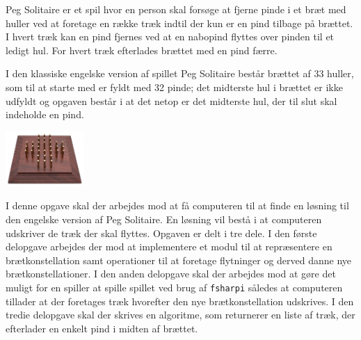 Peg Solitaire er et spil hvor en person skal forsøge at fjerne pinde i
et bræt med huller ved at foretage en række træk indtil der kun er en
pind tilbage på brættet. I hvert træk kan en pind fjernes ved at en
nabopind flyttes over pinden til et ledigt hul. For hvert træk
efterlades brættet med en pind færre.

\begin{minipage}{.75\linewidth}
I den klassiske engelske version af spillet Peg Solitaire består
brættet af 33 huller, som til at starte med er fyldt med 32 pinde; det
midterste hul i brættet er ikke udfyldt og opgaven består i at det
netop er det midterste hul, der til slut skal indeholde en pind.
\end{minipage}
\begin{minipage}{.2\linewidth}
  \includegraphics[width=3cm]{solitaire.png}
\end{minipage}

I denne opgave skal der arbejdes mod at få computeren til at finde en
løsning til den engelske version af Peg Solitaire. En løsning vil
bestå i at computeren udskriver de træk der skal flyttes. Opgaven er
delt i tre dele. I den første delopgave arbejdes der mod at
implementere et modul til at repræsentere en brætkonstellation samt
operationer til at foretage flytninger og derved danne nye
brætkonstellationer. I den anden delopgave skal der arbejdes mod at
gøre det muligt for en spiller at spille spillet ved brug
af \texttt{fsharpi} således at computeren tillader at der foretages træk
hvorefter den nye brætkonstellation udskrives. I den tredie delopgave skal
der skrives en algoritme, som returnerer en liste af træk, der
efterlader en enkelt pind i midten af brættet.
